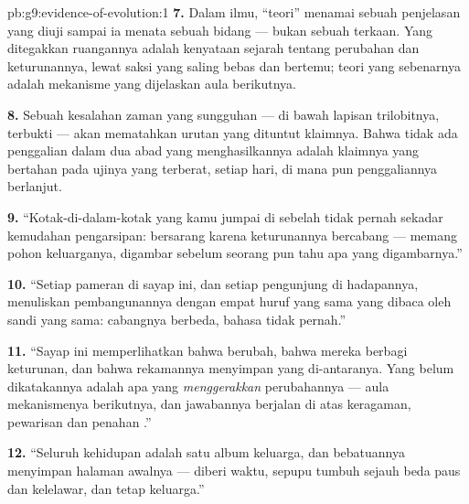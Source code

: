 \begin{solution}{pb:g9:evidence-of-evolution:1}
\textbf{7.} Dalam ilmu, ``teori'' menamai sebuah penjelasan
yang diuji sampai ia menata sebuah bidang --- bukan sebuah
terkaan. Yang ditegakkan ruangannya adalah kenyataan
sejarah tentang perubahan dan keturunannya, lewat saksi yang
saling bebas dan bertemu; teori yang sebenarnya adalah
mekanisme yang dijelaskan aula berikutnya.

\textbf{8.} Sebuah kesalahan zaman yang sungguhan --- 
 di bawah lapisan trilobitnya, terbukti --- akan
mematahkan urutan yang dituntut klaimnya. Bahwa tidak ada
penggalian dalam dua abad yang menghasilkannya adalah
klaimnya yang bertahan pada ujinya yang terberat, setiap
hari, di mana pun penggaliannya berlanjut.

\textbf{9.} ``Kotak-di-dalam-kotak yang kamu jumpai di
sebelah tidak pernah sekadar kemudahan pengarsipan:
 bersarang karena keturunannya bercabang ---
 memang pohon keluarganya, digambar sebelum
seorang pun tahu apa yang digambarnya.''

\textbf{10.} ``Setiap pameran di sayap ini, dan setiap
pengunjung di hadapannya, menuliskan pembangunannya dengan
empat huruf yang sama yang dibaca oleh sandi yang sama:
cabangnya berbeda, bahasa  tidak pernah.''

\textbf{11.} ``Sayap ini memperlihatkan bahwa 
berubah, bahwa mereka berbagi keturunan, dan bahwa rekamannya
menyimpan yang di-antaranya. Yang belum dikatakannya adalah
apa yang \emph{menggerakkan} perubahannya --- aula
mekanismenya berikutnya, dan jawabannya berjalan di atas
keragaman, pewarisan dan penahan .''

\textbf{12.} ``Seluruh kehidupan adalah satu album keluarga,
dan bebatuannya menyimpan halaman awalnya --- diberi waktu,
sepupu tumbuh sejauh beda paus dan kelelawar, dan tetap
keluarga.''
\end{solution}
